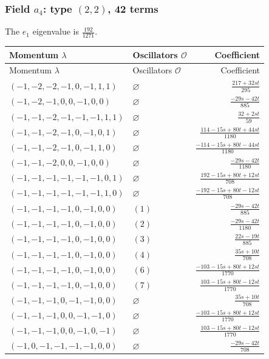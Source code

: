 \subsubsection{\texorpdfstring{Field $a_{4}$: type $(2,2)$, 42 terms}{Field a4: type (2,2), 42 terms}}
The $e_1$ eigenvalue is $\frac{192}{1271}$. 
\begingroup\scriptsize\setlength{\tabcolsep}{3pt}\renewcommand{\arraystretch}{1.35}
\begin{longtable}{@{}llr@{}}
\toprule Momentum $\lambda$&Oscillators $\mathcal O$&Coefficient\\\midrule\endfirsthead
\toprule Momentum $\lambda$&Oscillators $\mathcal O$&Coefficient\\\midrule\endhead
\bottomrule\endfoot
$(-1,-2,-2,-1,0,-1,1,1)$ & $\varnothing$ & $\frac{217+32st}{295}$\\
$(-1,-2,-1,0,0,-1,0,0)$ & $\varnothing$ & $\frac{-29s-42t}{885}$\\
$(-1,-1,-2,-1,-1,-1,1,1)$ & $\varnothing$ & $\frac{32+2st}{59}$\\
$(-1,-1,-2,-1,0,-1,0,1)$ & $\varnothing$ & $\frac{114-15s+80t+44st}{1180}$\\
$(-1,-1,-2,-1,0,-1,1,0)$ & $\varnothing$ & $\frac{-114-15s+80t-44st}{1180}$\\
$(-1,-1,-2,0,0,-1,0,0)$ & $\varnothing$ & $\frac{-29s-42t}{1180}$\\
$(-1,-1,-1,-1,-1,-1,0,1)$ & $\varnothing$ & $\frac{192-15s+80t+12st}{708}$\\
$(-1,-1,-1,-1,-1,-1,1,0)$ & $\varnothing$ & $\frac{-192-15s+80t-12st}{708}$\\
$(-1,-1,-1,-1,0,-1,0,0)$ & $(1)$ & $\frac{-29s-42t}{885}$\\
$(-1,-1,-1,-1,0,-1,0,0)$ & $(2)$ & $\frac{-29s-42t}{1180}$\\
$(-1,-1,-1,-1,0,-1,0,0)$ & $(3)$ & $\frac{22s-19t}{885}$\\
$(-1,-1,-1,-1,0,-1,0,0)$ & $(4)$ & $\frac{35s+10t}{708}$\\
$(-1,-1,-1,-1,0,-1,0,0)$ & $(6)$ & $\frac{-103-15s+80t+12st}{1770}$\\
$(-1,-1,-1,-1,0,-1,0,0)$ & $(7)$ & $\frac{103-15s+80t-12st}{1770}$\\
$(-1,-1,-1,0,-1,-1,0,0)$ & $\varnothing$ & $\frac{35s+10t}{708}$\\
$(-1,-1,-1,0,0,-1,-1,0)$ & $\varnothing$ & $\frac{-103-15s+80t+12st}{1770}$\\
$(-1,-1,-1,0,0,-1,0,-1)$ & $\varnothing$ & $\frac{103-15s+80t-12st}{1770}$\\
$(-1,0,-1,-1,-1,-1,0,0)$ & $\varnothing$ & $\frac{-29s-42t}{708}$\\

\end{longtable}

